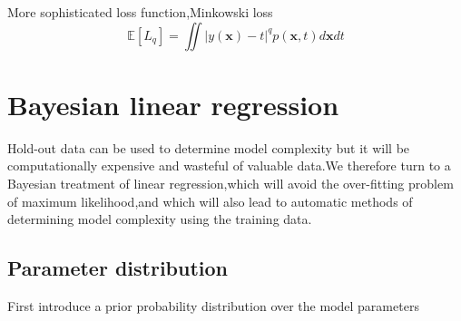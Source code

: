 More sophisticated loss function,Minkowski loss
\begin{equation}
\mathbb{E}[\mathit{L_q}] = \iint| y(\textbf{x}) - t |^q p(\textbf{x},t)d\textbf{x}dt
\end{equation}


\section{Bayesian linear regression}
Hold-out data can be used to determine model complexity but it will be 
computationally expensive and wasteful of valuable data.We therefore turn to a Bayesian treatment of linear regression,which will avoid the over-fitting problem of maximum likelihood,and which will also lead to automatic methods of determining model complexity using the training data.

\subsection{Parameter distribution}
First introduce a prior probability distribution over the model parameters 





